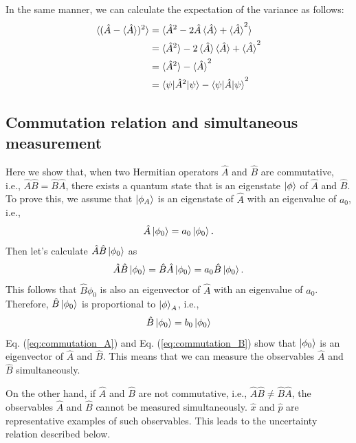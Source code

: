 In the same manner, we can calculate the expectation of the variance as follows:
\begin{equation}
  \begin{aligned}
  	\braket{(\hat A - \braket{\hat A})^2} &= \braket{\hat A^2 - 2\hat A\braket{\hat A} + \braket{\hat A}^2}\\
  	&= \braket {\hat A^2} - 2\braket{\hat A}\braket{\hat A} + \braket {\hat A}^2\\
  	&= \braket {\hat A^2} - \braket {\hat A}^2\\
  	&= \braket{\psi|\hat A^2|\psi} - \braket{\psi|\hat A|\psi}^2
  \end{aligned}
\end{equation}

\subsection{Commutation relation and simultaneous measurement}

Here we show that, when two Hermitian operators $\hat A$ and $\hat B$ are commutative, i.e., $\hat A \hat B = \hat B \hat A$, there exists a quantum state that is an eigenstate $\ket \phi$ of $\hat A$ and $\hat B$. To prove this, we assume that $\ket {\phi_A}$ is an eigenstate of $\hat A$ with an eigenvalue of $a_0$, i.e., 
\begin{equation}
  \hat A\ket {\phi_0} = a_0 \ket{\phi_0}.
  \label{eq:commutation_A}
\end{equation}
Then let's calculate $\hat A\hat B \ket {\phi_0}$ as
\begin{equation}
  \hat A \hat B \ket{\phi_0} = \hat B \hat A \ket{\phi_0} = a_0 \hat B \ket{\phi_0}.
\end{equation}
This follows that $\hat B \phi_0$ is also an eigenvector of $\hat A$ with an eigenvalue of $a_0$. Therefore, $\hat B\ket{\phi_0}$ is proportional to $\ket \phi_A$, i.e.,
\begin{equation}
  \hat B \ket{\phi_0} = b_0 \ket{\phi_0}
  \label{eq:commutation_B}
\end{equation}
Eq. (\ref{eq:commutation_A}) and Eq. (\ref{eq:commutation_B}) show that $\ket {\phi_0}$ is an eigenvector of $\hat A$ and $\hat B$. This means that we can measure the observables $\hat A$ and $\hat B$ simultaneously. 

On the other hand, if $\hat A$ and $\hat B$ are not commutative, i.e., $\hat A \hat B \neq \hat B \hat A$, the observables $\hat A$ and $\hat B$ cannot be measured simultaneously. $\hat x$ and $\hat p$ are representative examples of such observables. This leads to the uncertainty relation described below.

